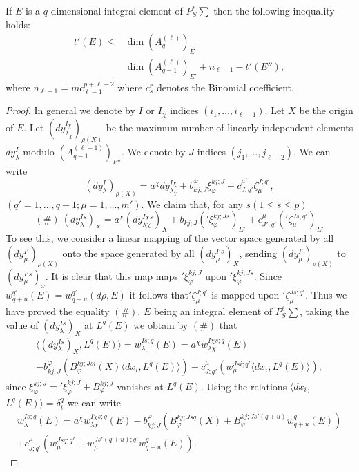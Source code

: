 \begin{proposition}\label{chap3:sec3.8:prop12}%
  If $E$ is a $q$-dimensional integral element of $P_S^\ell \sum$ then
  the following inequality holds: 
  \begin{align*}
    t'(E) \leq & \dim (A_q^{(\ell)} )_E\\
    & \dim (A_{q-1}^{(\ell)} )_{E'} + n_{\ell -1} - t' (E''),
  \end{align*}
  where $n _{\ell -1} = m c^{p+\ell-2}_{\ell -1}$ where $c^r_s$
  denotes the Binomial coefficient. 
\end{proposition} 
 
\begin{proof}
  In general we denote by $I$ or $I_{\chi}$ indices $(i_1, \ldots,
  i_{\ell -1})$. Let $X$  be the origin of $E$. Let $\left(dy_{\lambda_
    \chi}^{I_\chi}\right)_{\rho (X)}$ be the maximum number of linearly
  independent elements $dy_{\lambda}^I$ modulo $(A^{(\ell
    -1)}_{q-1})_{E''}$. We denote by $J$ indices $(j_1, \ldots, j_{\ell
    -2})$. We can write  	 
  $$
  (dy_{\lambda}^{I}) _{\rho (X)} = a^\chi dy_{\lambda_\chi}^{I \chi}
  + b_{kj;J}^\varphi \xi_{\varphi}^{kj;J} + c_{J, q'}^{\mu '}
  \zeta_{\mu}^{J;q'},  
  $$
  $(q' = 1, \ldots, q-1 ; \mu = 1,\ldots, m')$. We claim that, for any
  $s(1 \leq s \leq p)$  
  $$
  (\#) ~(dy_{\lambda}^{Is})_X = a^\chi (dy_{\lambda \chi}^{I \chi s})_X
  + b_{kj;J} ('\xi_{\varphi}^{kj;Js})_{E'} + c_{J';q'}^\mu('\zeta
  _{\mu}^{Js, q'})_{E'} 
  $$
  To see this, we consider a linear mapping of the vector space
  generated by all $(dy_\mu^{I'})_{\rho (X)}$ onto the space generated
  by all $(dy_\mu^{I's})_X$, sending $(dy_\mu^{I'})_{\rho (X)}$ to
  $\left(dy^{I's}_{\mu} \right)_x$. It is clear that this map maps
  $'\xi_\varphi ^{kj;J}$ upon 
  $'\xi_\varphi ^{kj;Js}$. Since $w_{q+u}^{q'} (E) = w_{q+u}^{q'} (
  d\rho,E) $ it follows  that\pageoriginale $'\zeta _\mu^{J ; q'}$ is mapped upon
  $'\zeta _\mu^{Js ; q'}$. Thus we have proved the equality $(\#)$. $E$
  being an integral element of $P_S^\ell \sum$, taking the value of
  $(dy_\lambda^{Is})_X$ at $L^q (E)$ we obtain by $(\#)$ that  
  \begin{multline*}
    \langle (dy_\lambda^{Is})_X , L^q (E) \rangle  = w_{\lambda}^{Is;q} (E)
    = a^\chi w_{\lambda \chi}^{I \chi s;q} (E)\\  
    - b^{\varphi}_{kj;J}
    (B_{\varphi}^{kj; Jsi} (X) \langle dx_i, L^q (E) \rangle ) +
    c_{J;q'}^\mu (w_{\mu}^{Jsi ; q'} \langle dx_i, L^q (E) \rangle ), 
  \end{multline*}
 since $\xi_{\varphi}^{kj;J} = {'\xi}_{\varphi}^{kj ; J} +
 B_{\varphi}^{kj ; J}$ vanishes at $L^q (E)$. Using the relations
 $\langle dx_i$, $L^q (E) \rangle = \delta _i^q$ we can write 
 \begin{multline*}
   w_{\lambda}^{Is ; q}(E) = a^{\chi} w_{\lambda \chi}^{I \chi s ; q}(E)
   - b^{\varphi}_{kj ; J} (B _{\varphi}^{kj ; Jsq} (X) + B
   _{\varphi}^{kj;Js' (q+u)} w^{q}_{q+u} (E))\\ 
   + c^{\mu}_{J;q'}
   \left(w_{\mu}^{Jsq ; q'} + w_{\mu}^{Js'(q+u) ; q'} w^q_{q+u} (E)\right).   
 \end{multline*}
 

\end{proof}
